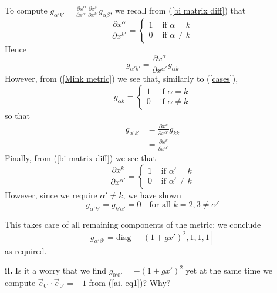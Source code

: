 \documentclass[a4paper]{article} %
\begin{document}
To compute $g_{\alpha'k'}=\frac{\partial x^{\alpha}}{\partial x^{\alpha'}}\frac{\partial x^{\beta}}{\partial x^{k'}}g_{\alpha\beta}$, we recall from (\ref{bi matrix diff}) that
\begin{equation}
\frac{\partial x^{\alpha}}{\partial x^{k'}}=
\begin{cases}
1 & \text{ if } \alpha = k \\
0 & \text{ if } \alpha \neq k
\end{cases}\label{cases}
\end{equation}
Hence
\begin{equation}
g_{\alpha'k'}=\frac{\partial x^{\alpha}}{\partial x^{\alpha'}}g_{\alpha k}
\end{equation}
However, from (\ref{Mink metric}) we see that, similarly to (\ref{cases}),
\begin{equation}
g_{\alpha k}=
\begin{cases}
1 & \text{ if } \alpha = k \\
0 & \text{ if } \alpha \neq k
\end{cases}
\end{equation}
so that
\begin{align}
g_{\alpha' k'}&=\frac{\partial x^k}{\partial x^{\alpha'}}g_{kk}\\
&=\frac{\partial x^k}{\partial x^{\alpha'}}
\end{align}
Finally, from (\ref{bi matrix diff}) we see that
\begin{equation}
\frac{\partial x^{k}}{\partial x^{\alpha'}}=
\begin{cases}
1 & \text{ if } \alpha' = k \\
0 & \text{ if } \alpha' \neq k
\end{cases}
\end{equation}
However, since we require $\alpha'\neq k$, we have shown
\begin{equation}
g_{\alpha' k'}=g_{k' \alpha'}=0 \quad\text{for all }k=2,3\neq \alpha'
\end{equation}

This takes care of all remaining components of the metric; we conclude
\begin{equation}
g_{\alpha' \beta'}=\text{diag}[-(1+gx')^2,1,1,1]
\end{equation}
as required.



\begin{framed}
\textbf{ii.} Is it a worry that we find $g_{0'0'}=-(1+gx')^2$ yet at the same time we compute $\vec{e}_{0'}\cdot\vec{e}_{0'}=-1$ from (\ref{ai. eq1})? Why?
\end{framed}
\end{document}
